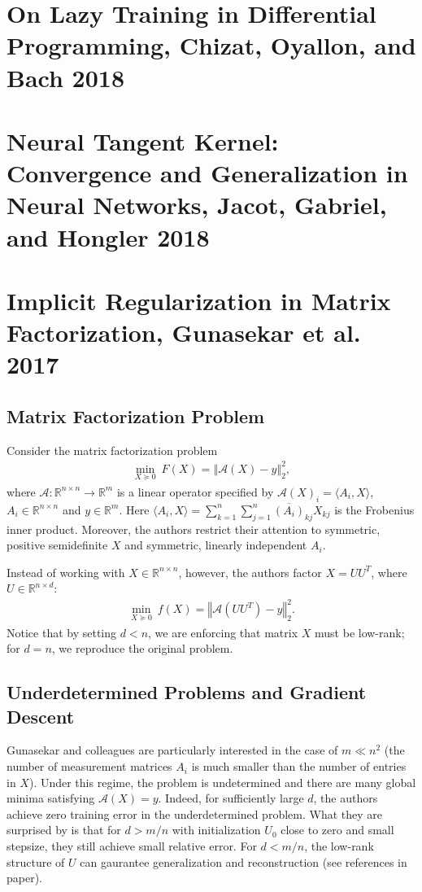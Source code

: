 \documentclass{article}
\begin{document}
\section{On Lazy Training in Differential Programming, Chizat, Oyallon, and Bach 2018}
\section{Neural Tangent Kernel: Convergence and Generalization in Neural Networks, Jacot, Gabriel, and Hongler 2018}

\section{Implicit Regularization in Matrix Factorization, Gunasekar et al. 2017}
\subsection{Matrix Factorization Problem}
Consider the matrix factorization problem
\begin{align*}
    \underset{X \succeq 0}{\min} \ F(X) = \left\Vert \mathcal{A}(X) - y \right\Vert_2^2,
\end{align*}
where $\mathcal{A}: \mathbb{R}^{n \times n} \rightarrow \mathbb{R}^m$ is a linear operator specified by $\mathcal{A}(X)_i = \langle A_i, X \rangle$, $A_i \in \mathbb{R}^{n \times n}$ and $y \in \mathbb{R}^m$. Here $\langle A_i, X \rangle = \sum_{k=1}^n \sum_{j=1}^n \overline{(A_i)}_{kj} X_{kj}$ is the Frobenius inner product. Moreover, the authors restrict their attention to symmetric, positive semidefinite $X$ and symmetric, linearly independent $A_i$.

Instead of working with $X \in \mathbb{R}^{n \times n}$, however, the authors factor $X = UU^T$, where $U \in \mathbb{R}^{n \times d}$:
\begin{align*}
    \underset{X \succeq 0}{\min} \ f(X) = \left\Vert \mathcal{A}(UU^T) - y \right\Vert_2^2.
\end{align*}
Notice that by setting $d < n$, we are enforcing that matrix $X$ must be low-rank; for $d = n$, we reproduce the original problem.

\subsection{Underdetermined Problems and Gradient Descent}
Gunasekar and colleagues are particularly interested in the case of $m \ll n^2$ (the number of measurement matrices $A_i$ is much smaller than the number of entries in $X$). Under this regime, the problem is undetermined and there are many global minima satisfying $\mathcal{A}(X) = y$. Indeed, for sufficiently large $d$, the authors achieve zero training error in the underdetermined problem. What they are surprised by is that for $d > m/n$ with initialization $U_0$ close to zero and small stepsize, they still achieve small relative error. For $d < m/n$, the low-rank structure of $U$ can gaurantee generalization and reconstruction (see references in paper). 
\end{document}
